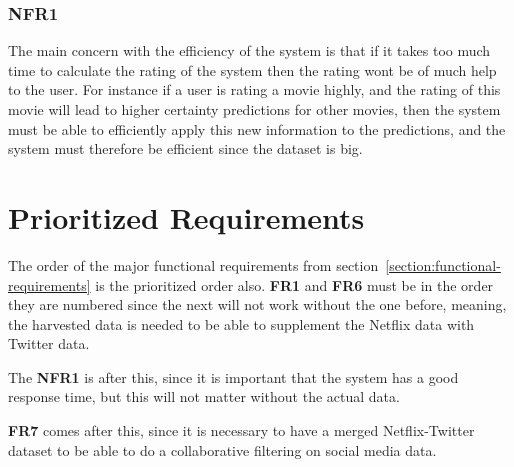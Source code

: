 \subsubsection{NFR1}
The main concern with the efficiency of the system is that if it takes too much time to calculate the rating of the system then the rating wont be of much help to the user. For instance if a user is rating a movie highly, and the rating of this movie will lead to higher certainty predictions for other movies, then the system must be able to efficiently apply this new information to the predictions, and the system must therefore be efficient since the dataset is big.


\section{Prioritized Requirements}
The order of the major functional requirements from section~\ref{section:functional-requirements} is the prioritized order also. \textbf{FR1} and \textbf{FR6} must be in the order they are numbered since the next will not work without the one before, meaning, the harvested data is needed to be able to supplement the Netflix data with Twitter data.

The \textbf{NFR1} is after this, since it is important that the system has a good response time, but this will not matter without the actual data.

\textbf{FR7} comes after this, since it is necessary to have a merged Netflix-Twitter dataset to be able to do a collaborative filtering on social media data.
